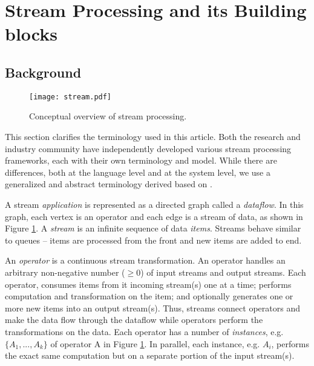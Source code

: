 \section{Stream Processing and its Building blocks}

\subsection{Background}

\begin{figure}[h]
	\centering
	\texttt{[image: stream.pdf]}
	\caption{Conceptual overview of stream processing.}
	\label{fig:stream}
\end{figure}

This section clarifies the terminology used in this article. Both the research and industry community have independently developed various stream processing frameworks, each with their own terminology and model. While there are differences, both at the language level and at the
system level, we use a generalized and abstract terminology derived based on \cite{optimization-survey}.

A stream \textit{application} is represented as a directed graph called a \textit{dataflow}. In this graph, each vertex is an operator and each edge is a stream of data, as shown in Figure \ref{fig:stream}.
A \textit{stream} is an infinite sequence of data \textit{items}. Streams behave similar to queues -- items are processed from the front and new items are added to end.

An \textit{operator} is a continuous stream transformation. An operator handles an arbitrary non-negative number ($\geq 0$) of input streams and output streams. Each operator, consumes items from it incoming stream(s) one at a time; performs computation and transformation on the item; and optionally generates one or more new items into an output stream(s). Thus, streams connect operators and make the data flow through the dataflow while operators perform the transformations on the data. 
Each operator has a number of \textit{instances}, e.g. $\{A_1, ..., A_k\}$ of operator A in Figure \ref{fig:stream}. In parallel, each instance, e.g. $A_i$, performs the exact same computation but on a separate portion of the input stream(s).

 



